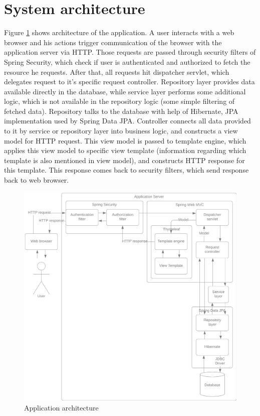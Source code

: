 \documentclass[a4paper,twoside,12pt]{book}
\begin{document}
  \section{System architecture}
    Figure \ref{fig:architecture_diagram} shows architecture of the application. 
    A user interacts with a web browser and his actions trigger communication of the browser with the application server via HTTP.
    Those requests are passed through security filters of Spring Security, which check if user is authenticated and authorized to fetch the resource he requests.
    After that, all requests hit dispatcher servlet, which delegates request to it's specific request controller.
    Repository layer provides data available directly in the database, 
    while service layer performs some additional logic, which is not available in the repository logic (some simple filtering of fetched data).
    Repository talks to the database with help of Hibernate, JPA implementation used by Spring Data JPA. 
    Controller connects all data provided to it by service or repository layer into business logic, and constructs a view model for HTTP request.
    This view model is passed to template engine, 
    which applies this view model to specific view template (information regarding which template is also mentioned in view model), 
    and constructs HTTP response for this template.
    This response comes back to security filters, which send response back to web browser.
    \begin{figure}%
      \includegraphics[width=\linewidth]{architecture_diagram.png}
      \caption{Application architecture}
      \label{fig:architecture_diagram}
    \end{figure}
\end{document}
